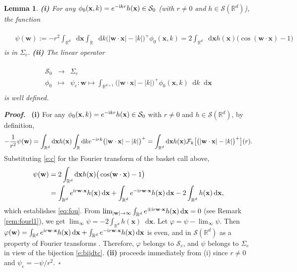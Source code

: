 \documentclass[11pt,A4,twoside]{article}
\numberwithin{equation}{section}
\renewcommand{\b}[1]{{\color{blue}#1}}
\renewcommand{\vec}{\mathbf}
\newcommand{\F}{\mathcal{F}}
\renewcommand*\d{\mathop{}\!\mathrm{d}}
\newcommand{\x}{\mathbf{x}}
\newcommand{\w}{\mathbf{w}}
\newcommand{\R}{\mathbbm{R}}
\renewcommand{\S}{\mathcal{S}}
\newcommand{\M}{\Sigma}
\def\bel{\begin{eqnarray*}\begin{aligned}}
\def\eel{\end{aligned}\end{eqnarray*}}
\newcommand{\beqa}{\begin{eqnarray}}
\newcommand{\eeqa}{\end{eqnarray}}
\def\bal{\begin{aligned}}
\def\eal{\end{aligned}}
\def\bll#1{
\beqa\label{#1}\bal
}\def\lel{\eal\eeqa}
\newcommand{\beql}[1]{\bll{#1}}
\newcommand{\eeql}{\lel}
\newtheorem{lemma}[theorem]{Lemma}
\theoremstyle{definition}
\theoremstyle{remark}
\def\R{\mathbb{R}}
\def\finproof {$\Box$ \vskip 5 pt }\def\finproof{\rule{4pt}{6pt}}\def\finproof{\ensuremath{\square}}
\def\proof{\noindent \emph{\textbf{Proof.} $\, $}}
\def\theh{\b{h}}\def\theh{h}
\def\thermi{{\rm i}}%
\begin{document}
 
\begin{lemma}\label{l:phiO}
{\rm
   \textbf{(i)}} For any $\phi_0(\vec x, k)=e^{-\thermi  kr} \theh(\vec x) \in \S_0$ (with $r\neq 0$ and $h\in\S(\R^d)$), the function %
    \beql{eq:fou}
       & %
       \psi (\w)  :=
        - r^{2} \int_{\R^{d}} \d \x  \int_{\R}  \d k \big(|\w \cdot \x | - |k |\big)^+ \phi_0(\x, k)
        = 2\int_{\R^{d}} \d \x h(\x) \big(\cos (\w \cdot \x) - 1 \big)
    \eeql
    is in $\M_e.$
{\rm\hfill\break \textbf{(ii)}} The linear operator
\beql{e:ptop}\begin{array}{rcl}
     \S_0 & \longrightarrow & \M_e  \\
     \phi_0 & \longmapsto & \displaystyle \psi_e : \w \mapsto \int_{\R^{d+1}} \big(|\w \cdot \x|  - |k| \big)^+ \phi_0 (\x,k) \d k \d\x 
\end{array}
\eeql
is well defined.
\end{lemma}

 
\proof  
{\rm
   \textbf{(i)}}
For any $\phi_0(\vec x, k)=e^{-\thermi  kr} \theh(\vec x) \in \S_0$ with $r\neq 0$ and $h\in\S(\R^d)$, by definition, 
\bel
-\frac{1}{r^{2}}\psi(\w) =   \int_{\R^{d}} \d \x  h(\x) \int_{\R}  \d k e^{-\thermi rk} \big(|\w \cdot \x | - |k |\big)^+ =  \int_{\R^{d}} \d \x  h(\x)     \F_{k} \big[\big(|\w \cdot \x | - |k |\big)^+\big](r).
\eel
Substituting \eqref{e:c} for the Fourier transform of the basket call above,%
\bel
\psi(\w) & = 2\int_{\R^{d}} \d \x h(\x) \big(\cos (\w \cdot \x) - 1 \big)
\\
& = \int_{\R^{d}} e^{  \thermi  r \w \cdot \x}\theh(\x) \d \x   +\int_{\R^{d}} e^{  -\thermi   r \w \cdot \x}\theh(\x) \d \x - 2\int_{\R^d}\theh(\x)\d \x,
\eel
which establishes \eqref{eq:fou}. From $\lim_{|\w|\to\infty}\int_{\R^{d}} e^{  \pm \thermi  r \w \cdot \x}\theh(\x) \d \x =0$ %
(see Remark \ref{rem:fourl1}), we get $\lim_{\pmb{\infty}}\psi =- 2\int_{\R^d}\theh(\x)\d \x$. 
Let $\varphi = \psi - \lim_{\pmb{\infty}}\psi$.  Then $\varphi (\w)=\int_{\R^{d}} e^{  \thermi  r \w \cdot \x}\theh(\x) \d \x   +\int_{\R^{d}} e^{  -\thermi   r \w \cdot \x}\theh(\x) \d \x$ is even, and in $\mathcal{S}(\R^d)$ as a property of Fourier transforms \cite[Theorem 2 page 143]{kanwal}. Therefore, 
$\varphi$ belongs to $\S_e$, and
$\psi$ belongs to $\M_e$ in view of the bijection \eqref{e:bijdtc}.
{\rm\hfill\break \textbf{(ii)}} proceeds immediately from (i) since $r\neq 0$ and $\psi_e = -\psi/r^2$.\ \finproof\\
 
\end{document}

